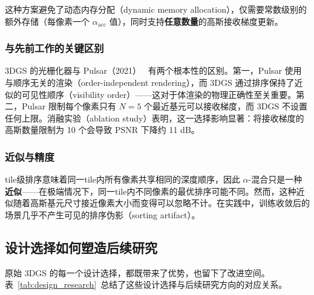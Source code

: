 这种方案避免了动态内存分配（dynamic memory allocation），仅需要常数级别的额外存储（每像素一个 $\alpha_{\mathrm{acc}}$ 值），同时支持\textbf{任意数量}的高斯接收梯度更新。

\subsubsection{与先前工作的关键区别}

3DGS 的光栅化器与 Pulsar（2021）~\cite{Lassner_2021_CVPR} 有两个根本性的区别。第一，Pulsar 使用与顺序无关的渲染（order-independent rendering），而 3DGS 通过排序保持了近似的可见性顺序（visibility order）——这对于体渲染的物理正确性至关重要。第二，Pulsar 限制每个像素只有 $N=5$ 个最近基元可以接收梯度，而 3DGS 不设置任何上限。消融实验（ablation study）表明，这一选择影响显著：将接收梯度的高斯数量限制为 10 个会导致 PSNR 下降约 11 dB。

\subsubsection{近似与精度}

tile级排序意味着同一tile内所有像素共享相同的深度顺序，因此 $\alpha$-混合只是一种\textbf{近似}——在极端情况下，同一tile内不同像素的最优排序可能不同。然而，这种近似随着高斯基元尺寸接近像素大小而变得可以忽略不计。在实践中，训练收敛后的场景几乎不产生可见的排序伪影（sorting artifact）。

\subsection{设计选择如何塑造后续研究}
\label{sec:01_1_6}

原始 3DGS 的每一个设计选择，都既带来了优势，也留下了改进空间。表~\ref{tab:design_research}~总结了这些设计选择与后续研究方向的对应关系。

